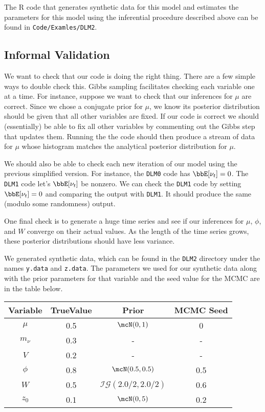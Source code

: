 \documentclass{article}
\begin{document}
\begin{aside}
The R code that generates synthetic data for this model and estimates the parameters for this model using the inferential procedure described above can be found in \texttt{Code/Examles/DLM2}.
\end{aside}

\subsection{Informal Validation}

We want to check that our code is doing the right thing.  There are a few simple ways to double check this.  Gibbs sampling facilitates checking each variable one at a time.  For instance, suppose we want to check that our inferences for $\mu$ are correct.  Since we chose a conjugate prior for $\mu$, we know its posterior distribution should be given that all other variables are fixed.  If our code is correct we should (essentially) be able to fix all other variables by commenting out the Gibbs step that updates them.  Running the the code should then produce a stream of data for $\mu$ whose histogram matches the analytical posterior distribution for $\mu$.

We should also be able to check each new iteration of our model using the previous simplified version.  For instance, the \texttt{DLM0} code has $\bbE[\nu_t] = 0$.  The \texttt{DLM1} code let's $\bbE[\nu_t]$ be nonzero.  We can check the \texttt{DLM1} code by setting $\bbE[\nu_t] = 0$ and comparing the output with \texttt{DLM1}.  It should produce the same (modulo some randomness) output.

One final check is to generate a huge time series and see if our inferences for $\mu$, $\phi$, and $W$ converge on their actual values.  As the length of the time series grows, these posterior distributions should have less variance.

We generated synthetic data, which can be found in the \texttt{DLM2} directory under the names \texttt{y.data} and \texttt{z.data}.  The parameters we used for our synthetic data along with the prior parameters for that variable and the seed value for the MCMC are in the table below.

\begin{center}
\begin{tabular}{c | c | c | c}
Variable & TrueValue & Prior & MCMC Seed\\
\hline
$\mu$ & 0.5 & $\mcN(0, 1)$ & 0 \\
\hline
$m_\nu$ & 0.3 & - & - \\
\hline
$V$ & 0.2 & - & - \\
\hline
$\phi$ & 0.8 & $\mcN(0.5, 0.5)$ & 0.5 \\
\hline
$W$ & 0.5 & $\mathcal{IG}(2.0/2, 2.0/2)$ & 0.6 \\
\hline
$z_0$ & 0.1 & $\mcN(0,5)$ & 0.2
\end{tabular}
\end{center}
\end{document}
